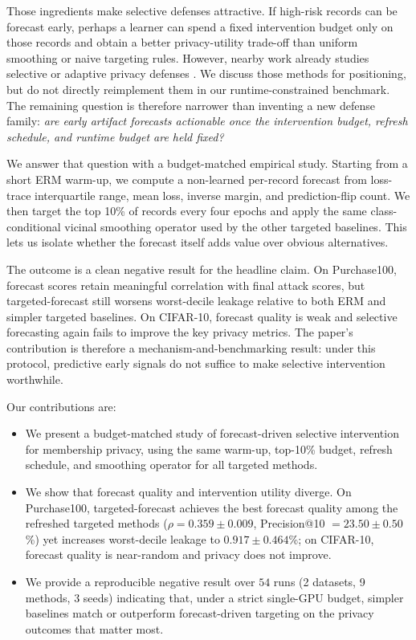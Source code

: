 \documentclass{article}
\newcommand{\purch}{Purchase100}
\newcommand{\cifar}{CIFAR-10}
\begin{document}
Those ingredients make selective defenses attractive. If high-risk records can be forecast early, perhaps a learner can spend a fixed intervention budget only on those records and obtain a better privacy-utility trade-off than uniform smoothing or naive targeting rules. However, nearby work already studies selective or adaptive privacy defenses \citep{li2024mist, jarin2022miashield, chen2025adamixup}. We discuss those methods for positioning, but do not directly reimplement them in our runtime-constrained benchmark. The remaining question is therefore narrower than inventing a new defense family: \emph{are early artifact forecasts actionable once the intervention budget, refresh schedule, and runtime budget are held fixed?}

We answer that question with a budget-matched empirical study. Starting from a short ERM warm-up, we compute a non-learned per-record forecast from loss-trace interquartile range, mean loss, inverse margin, and prediction-flip count. We then target the top 10\% of records every four epochs and apply the same class-conditional vicinal smoothing operator used by the other targeted baselines. This lets us isolate whether the forecast itself adds value over obvious alternatives.

The outcome is a clean negative result for the headline claim. On \purch{}, forecast scores retain meaningful correlation with final attack scores, but targeted-forecast still worsens worst-decile leakage relative to both ERM and simpler targeted baselines. On \cifar{}, forecast quality is weak and selective forecasting again fails to improve the key privacy metrics. The paper's contribution is therefore a mechanism-and-benchmarking result: under this protocol, predictive early signals do not suffice to make selective intervention worthwhile.

Our contributions are:
\begin{itemize}
    \item We present a budget-matched study of forecast-driven selective intervention for membership privacy, using the same warm-up, top-10\% budget, refresh schedule, and smoothing operator for all targeted methods.
    \item We show that forecast quality and intervention utility diverge. On \purch{}, targeted-forecast achieves the best forecast quality among the refreshed targeted methods ($\rho=0.359\pm0.009$, Precision@10 $=23.50\pm0.50$\%) yet increases worst-decile leakage to $0.917\pm0.464$\%; on \cifar{}, forecast quality is near-random and privacy does not improve.
    \item We provide a reproducible negative result over $54$ runs (2 datasets, 9 methods, 3 seeds) indicating that, under a strict single-GPU budget, simpler baselines match or outperform forecast-driven targeting on the privacy outcomes that matter most.
\end{itemize}
\end{document}
